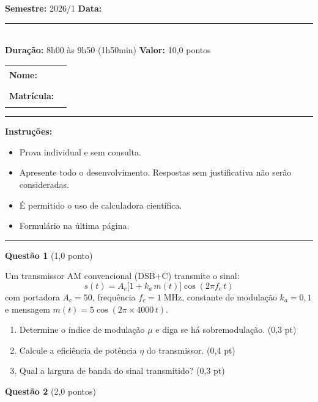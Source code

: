 \documentclass[11pt,a4paper]{article}
\begin{document}
\textbf{Semestre:} 2026/1 \hfill \textbf{Data:} \rule{3cm}{0.4pt} \\[0.15cm]
\textbf{Duração:} 8h00 às 9h50 (1h50min) \hfill \textbf{Valor:} 10{,}0 pontos

\vspace{0.4cm}
\begin{tabular}{@{}p{3cm}p{11cm}@{}}
  \textbf{Nome:} & \rule{11cm}{0.4pt} \\[0.35cm]
  \textbf{Matrícula:} & \rule{5cm}{0.4pt} \\
\end{tabular}

\vspace{0.3cm}
\noindent\rule{\textwidth}{0.4pt}

\textbf{Instruções:}
\begin{itemize}[nosep, leftmargin=1.5em]
  \item Prova individual e sem consulta.
  \item Apresente todo o desenvolvimento. Respostas sem justificativa não serão consideradas.
  \item É permitido o uso de calculadora científica.
  \item Formulário na última página.
\end{itemize}

\noindent\rule{\textwidth}{0.4pt}

\textbf{Questão 1} \hfill (1{,}0 ponto)

Um transmissor AM convencional (DSB+C) transmite o sinal:
\[
  s(t) = A_c\big[1 + k_a\,m(t)\big]\cos(2\pi f_c\,t)
\]
com portadora $A_c = 50$, frequência $f_c = 1\;\text{MHz}$, constante de modulação $k_a = 0{,}1$ e mensagem $m(t) = 5\cos(2\pi \times 4000\,t)$.

\begin{enumerate}[label=\alph*)]
  \item Determine o índice de modulação $\mu$ e diga se há sobremodulação. \hfill (0{,}3 pt)
  \item Calcule a eficiência de potência $\eta$ do transmissor. \hfill (0{,}4 pt)
  \item Qual a largura de banda do sinal transmitido? \hfill (0{,}3 pt)
\end{enumerate}

\textbf{Questão 2} \hfill (2{,}0 pontos)
\end{document}
